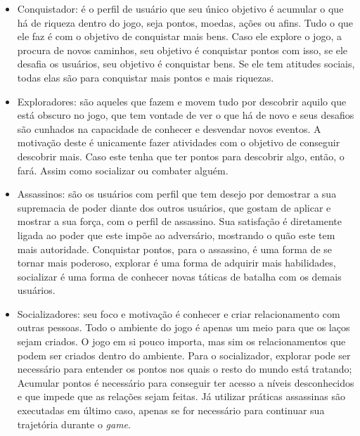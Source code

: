 \begin{itemize}
    \item Conquistador: é o perfil de usuário que seu único objetivo é acumular o
        que há de riqueza dentro do jogo, seja pontos, moedas, ações ou afins.
        Tudo o que ele faz é com o objetivo de conquistar mais bens. Caso ele explore
        o jogo, a procura de novos caminhos, seu objetivo é conquistar pontos com
        isso, se ele desafia os usuários, seu objetivo é conquistar bens. Se ele
        tem atitudes sociais, todas elas são para conquistar mais pontos e mais riquezas.
    \item Exploradores: são aqueles que fazem e movem tudo por descobrir aquilo
        que está obscuro no jogo, que tem vontade de ver o que há de novo e seus desafios
        são cunhados na capacidade de conhecer e desvendar novos eventos. A motivação
        deste é unicamente fazer atividades com o objetivo de conseguir descobrir mais.
        Caso este tenha que ter pontos para descobrir algo, então, o fará. Assim
        como socializar ou combater alguém.
    \item Assassinos: são os usuários com perfil que tem desejo por demostrar a sua
        supremacia de poder diante dos outros usuários, que gostam de aplicar
        e mostrar a sua força, com o perfil de assassino. Sua satisfação
        é diretamente ligada ao poder que este impõe ao adversário, mostrando
        o quão este tem mais autoridade. Conquistar pontos, para o assassino, é uma forma
        de se tornar mais poderoso, explorar é uma forma de adquirir mais habilidades,
        socializar é uma forma de conhecer novas táticas de batalha com os demais
        usuários.
    \item Socializadores: seu foco e motivação é conhecer e criar relacionamento
        com outras pessoas. Todo o ambiente do jogo é apenas um meio para que
        os laços sejam criados. O jogo em si pouco importa, mas sim os relacionamentos
        que podem ser criados dentro do ambiente. Para o socializador, explorar pode
        ser necessário para entender os pontos nos quais o resto do mundo está tratando;
        Acumular pontos é necessário para conseguir ter acesso a níveis desconhecidos
        e que impede que as relações sejam feitas. Já utilizar práticas assassinas são
        executadas em último caso, apenas se for necessário para continuar sua trajetória
        durante o \textit{game}.
\end{itemize}

